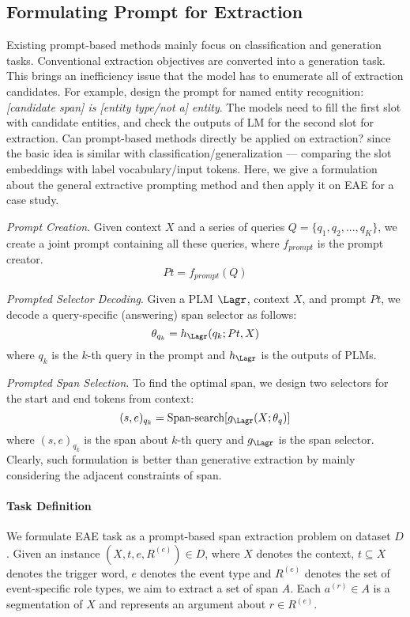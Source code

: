 \subsection{Formulating Prompt for Extraction}
\label{subsec: formulation}
Existing prompt-based methods mainly focus on classification and generation tasks. Conventional extraction objectives are converted into a generation task. This brings an inefficiency issue that the model has to enumerate all of extraction candidates. For example, \citet{cui-etal-2021-template} design the prompt for named entity recognition: \textit{[candidate span] is [entity type/not a] entity}. The models need to fill the first slot with candidate entities, and check the outputs of LM for the second slot for extraction. Can prompt-based methods directly be applied on extraction? since the basic idea is similar with classification/generalization --- comparing the slot embeddings with label vocabulary/input tokens. Here, we give a formulation about the general extractive prompting method and then apply it on EAE for a case study.

 \textit{Prompt Creation}. Given context $X$ and a series of queries $Q = \{q_1, q_2, ..., q_K\}$, we create a joint prompt containing all these queries, where $f_{prompt}$ is the prompt creator.
$$
Pt = f_{prompt}(Q)
$$

 \textit{Prompted Selector Decoding}. 
Given a PLM $\Lagr$, context $X$, and prompt $Pt$, we decode a query-specific (answering) span selector as follows:
$$
\theta_{q_k} = h_{\Lagr}(q_k; Pt, X) 
$$
where $q_k$ is the $k$-th query in the prompt and $h_{\Lagr}$ is the outputs of PLMs.

 \textit{Prompted Span Selection}. To find the optimal span, we design two selectors for the start and end tokens from context: 
$$
(s, e)_{q_k} = \text{Span-search} [g_{\Lagr}(X; \theta_q)]
$$
where $(s, e)_{q_k}$ is the span about $k$-th query and $g_{\Lagr}$ is the span selector. Clearly, such formulation is better than generative extraction by mainly considering the adjacent constraints of span.

\paragraph{Task Definition}
We formulate EAE task as a prompt-based span extraction problem on dataset $D$. Given an instance $(X, t, e, R^{(e)}) \in D$, where $X$ denotes the context, $t \subseteq X$ denotes the trigger word, $e$ denotes the event type and $R^{(e)}$ denotes the set of event-specific role types, we aim to extract a set of span $A$. Each $a^{(r)} \in A$ is a segmentation of $X$ and represents an argument about $r \in R^{(e)}$.

